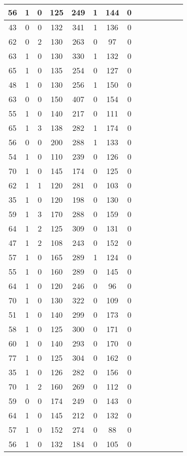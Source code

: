 \documentclass{article}
\begin{document}
\begin{longtable}{|c|c|c|c|c|c|c|c|c|c|c|c|c|c|}
\hline
56 & 1 & 0 & 125 & 249 & 1 & 144 & 0\\
\hline
43 & 0 & 0 & 132 & 341 & 1 & 136 & 0\\
\hline
62 & 0 & 2 & 130 & 263 & 0 & 97 & 0\\
\hline
63 & 1 & 0 & 130 & 330 & 1 & 132 & 0\\
\hline
65 & 1 & 0 & 135 & 254 & 0 & 127 & 0\\
\hline
48 & 1 & 0 & 130 & 256 & 1 & 150 & 0\\
\hline
63 & 0 & 0 & 150 & 407 & 0 & 154 & 0\\
\hline
55 & 1 & 0 & 140 & 217 & 0 & 111 & 0\\
\hline
65 & 1 & 3 & 138 & 282 & 1 & 174 & 0\\
\hline
56 & 0 & 0 & 200 & 288 & 1 & 133 & 0\\
\hline
54 & 1 & 0 & 110 & 239 & 0 & 126 & 0\\
\hline
70 & 1 & 0 & 145 & 174 & 0 & 125 & 0\\
\hline
62 & 1 & 1 & 120 & 281 & 0 & 103 & 0\\
\hline
35 & 1 & 0 & 120 & 198 & 0 & 130 & 0\\
\hline
59 & 1 & 3 & 170 & 288 & 0 & 159 & 0\\
\hline
64 & 1 & 2 & 125 & 309 & 0 & 131 & 0\\
\hline
47 & 1 & 2 & 108 & 243 & 0 & 152 & 0\\
\hline
57 & 1 & 0 & 165 & 289 & 1 & 124 & 0\\
\hline
55 & 1 & 0 & 160 & 289 & 0 & 145 & 0\\
\hline
64 & 1 & 0 & 120 & 246 & 0 & 96 & 0\\
\hline
70 & 1 & 0 & 130 & 322 & 0 & 109 & 0\\
\hline
51 & 1 & 0 & 140 & 299 & 0 & 173 & 0\\
\hline
58 & 1 & 0 & 125 & 300 & 0 & 171 & 0\\
\hline
60 & 1 & 0 & 140 & 293 & 0 & 170 & 0\\
\hline
77 & 1 & 0 & 125 & 304 & 0 & 162 & 0\\
\hline
35 & 1 & 0 & 126 & 282 & 0 & 156 & 0\\
\hline
70 & 1 & 2 & 160 & 269 & 0 & 112 & 0\\
\hline
59 & 0 & 0 & 174 & 249 & 0 & 143 & 0\\
\hline
64 & 1 & 0 & 145 & 212 & 0 & 132 & 0\\
\hline
57 & 1 & 0 & 152 & 274 & 0 & 88 & 0\\
\hline
56 & 1 & 0 & 132 & 184 & 0 & 105 & 0\\

\end{longtable}
\end{document}
